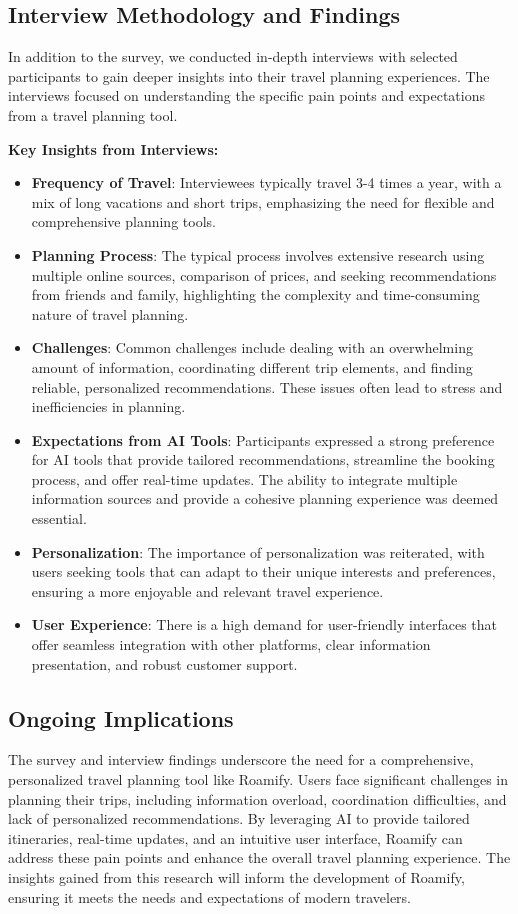 \documentclass[conference]{IEEEtran}
\begin{document}
\subsection{Interview Methodology and Findings}
In addition to the survey, we conducted in-depth interviews with selected participants to gain deeper insights into their travel planning experiences. The interviews focused on understanding the specific pain points and expectations from a travel planning tool.

\textbf{Key Insights from Interviews:}

\begin{itemize}
    \item \textbf{Frequency of Travel}: Interviewees typically travel 3-4 times a year, with a mix of long vacations and short trips, emphasizing the need for flexible and comprehensive planning tools.
    \item \textbf{Planning Process}: The typical process involves extensive research using multiple online sources, comparison of prices, and seeking recommendations from friends and family, highlighting the complexity and time-consuming nature of travel planning.
    \item \textbf{Challenges}: Common challenges include dealing with an overwhelming amount of information, coordinating different trip elements, and finding reliable, personalized recommendations. These issues often lead to stress and inefficiencies in planning.
    \item \textbf{Expectations from AI Tools}: Participants expressed a strong preference for AI tools that provide tailored recommendations, streamline the booking process, and offer real-time updates. The ability to integrate multiple information sources and provide a cohesive planning experience was deemed essential.
    \item \textbf{Personalization}: The importance of personalization was reiterated, with users seeking tools that can adapt to their unique interests and preferences, ensuring a more enjoyable and relevant travel experience.
    \item \textbf{User Experience}: There is a high demand for user-friendly interfaces that offer seamless integration with other platforms, clear information presentation, and robust customer support.
\end{itemize}

\subsection{Ongoing Implications}
The survey and interview findings underscore the need for a comprehensive, personalized travel planning tool like Roamify. Users face significant challenges in planning their trips, including information overload, coordination difficulties, and lack of personalized recommendations. By leveraging AI to provide tailored itineraries, real-time updates, and an intuitive user interface, Roamify can address these pain points and enhance the overall travel planning experience. The insights gained from this research will inform the development of Roamify, ensuring it meets the needs and expectations of modern travelers.
\end{document}
